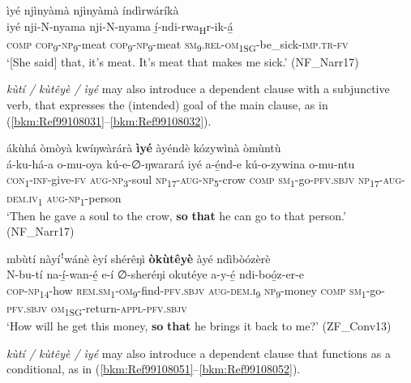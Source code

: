 \ea
\label{bkm:Ref71274256}
ìyé njìnyàmà njìnyàmà índìrwáríkà\\
\gll iyé  nji-N-nyama nji-N-nyama  í̲-ndi-rwa\textsubscript{H}r-ik-á̲ \\
\textsc{comp}  \textsc{cop}\textsubscript{9}-\textsc{np}\textsubscript{9}-meat
\textsc{cop}\textsubscript{9}-\textsc{np}\textsubscript{9}-meat  \textsc{sm}\textsubscript{9}.\textsc{rel}-\textsc{om}\textsubscript{1SG}-be\_sick-\textsc{imp}.\textsc{tr}-\textsc{fv}\\
\glt ‘[She said] that, it’s meat. It’s meat that makes me sick.’ (NF\_Narr17)
\z

\textit{kùtí / kùtêyè / ìyé} may also introduce a dependent clause with a subjunctive verb, that expresses the (intended) goal of the main clause, as in (\ref{bkm:Ref99108031}--\ref{bkm:Ref99108032}).

\ea
\label{bkm:Ref99108031}
ákùhá òmòyà kwíŋwàrárà \textbf{ìyé} àyéndè kózywìnà òmùntù\\
\gll á-ku-há-a    o-mu-oya    kú-e-∅-ŋwarará iyé  a-é̲nd-e    kú-o-zywina    o-mu-ntu\\
\textsc{con}\textsubscript{1}-\textsc{inf}-give-\textsc{fv}  \textsc{aug}-\textsc{np}\textsubscript{3}-soul  \textsc{np}\textsubscript{17}-\textsc{aug}-\textsc{np}\textsubscript{5}-crow
\textsc{comp}  \textsc{sm}\textsubscript{1}-go-\textsc{pfv}.\textsc{sbjv}  \textsc{np}\textsubscript{17}-\textsc{aug}-\textsc{dem}.\textsc{iv}\textsubscript{1}  \textsc{aug}-\textsc{np}\textsubscript{1}-person\\
\glt ‘Then he gave a soul to the crow, \textbf{so} \textbf{that} he can go to that person.’ (NF\_Narr17)
\z

\ea
\label{bkm:Ref99108032}
mbùtí nàyíꜝwánè èyí shérêŋì \textbf{òkùtêyè} àyé ndìbòózèrè\\
\gll N-bu-tí    na-í̲-wan-é̲        e-í    ∅-sheréŋi okutéye  a-y-é̲      ndi-boó̲z-er-e\\
\textsc{cop}-\textsc{np}\textsubscript{14}-how  \textsc{rem}.\textsc{sm}\textsubscript{1}-\textsc{om}\textsubscript{9}-find-\textsc{pfv}.\textsc{sbjv}  \textsc{aug}-\textsc{dem}.\textsc{i}\textsubscript{9}  \textsc{np}\textsubscript{9}-money
\textsc{comp}    \textsc{sm}\textsubscript{1}-go-\textsc{pfv}.\textsc{sbjv}  \textsc{om}\textsubscript{1SG}-return-\textsc{appl}-\textsc{pfv}.\textsc{sbjv}\\
\glt ‘How will he get this money, \textbf{so} \textbf{that} he brings it back to me?’ (ZF\_Conv13)
\z

\textit{kùtí / kùtêyè / ìyé} may also introduce a dependent clause that functions as a conditional, as in (\ref{bkm:Ref99108051}--\ref{bkm:Ref99108052}).

